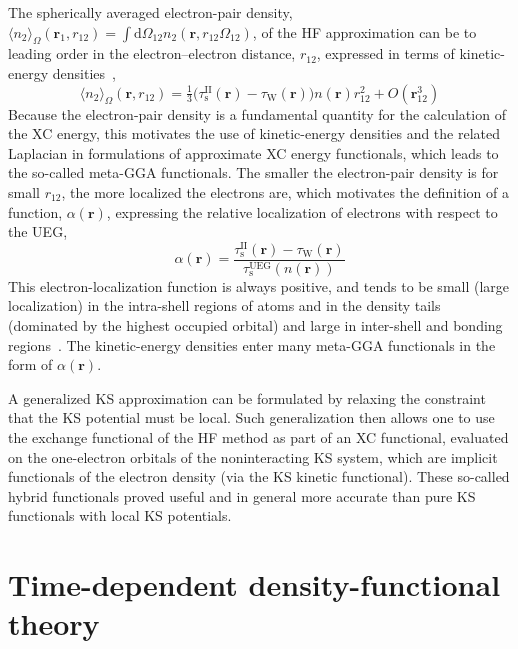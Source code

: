 The spherically averaged electron-pair density, $\langle n_2\rangle_\Omega(\mathbf r_1,r_{12})=\int\mathrm d\Omega_{12}n_2(\mathbf r,r_{12}\Omega_{12})$, of the HF approximation can be to leading order in the electron--electron distance, $r_{12}$, expressed in terms of kinetic-energy densities~\cite{BeckeJCP90},
\begin{equation}
  \langle n_2\rangle_\Omega(\mathbf r,r_{12})=\tfrac13\big(\tau_\text{s}^\text{II}(\mathbf r)-\tau_\text{W}(\mathbf r)\!\big)n(\mathbf r)r_{12}^2+O(\mathbf r_{12}^3)
  \label{eq:pair-correlation-expansion}
\end{equation}
Because the electron-pair density is a fundamental quantity for the calculation of the XC energy, this motivates the use of kinetic-energy densities and the related Laplacian in formulations of approximate XC energy functionals, which leads to the so-called meta-GGA functionals.
The smaller the electron-pair density is for small $r_{12}$, the more localized the electrons are, which motivates the definition of a function, $\alpha(\mathbf r)$, expressing the relative localization of electrons with respect to the UEG,
\begin{equation}
  \alpha(\mathbf r)=\frac{\tau_\text{s}^\text{II}(\mathbf r)-\tau_\text{W}(\mathbf r)}{\tau_\text{s}^\text{UEG}(n(\mathbf r)\!)}
  \label{eq:scan-alpha}
\end{equation}
This electron-localization function is always positive, and tends to be small (large localization) in the intra-shell regions of atoms and in the density tails (dominated by the highest occupied orbital) and large in inter-shell and bonding regions~\cite{SunPRL13}.
The kinetic-energy densities enter many meta-GGA functionals in the form of $\alpha(\mathbf r)$.

A generalized KS approximation can be formulated by relaxing the constraint that the KS potential must be local.
Such generalization then allows one to use the exchange functional of the HF method as part of an XC functional, evaluated on the one-electron orbitals of the noninteracting KS system, which are implicit functionals of the electron density (via the KS kinetic functional).
These so-called hybrid functionals proved useful and in general more accurate than pure KS functionals with local KS potentials.

\section{Time-dependent density-functional theory}


